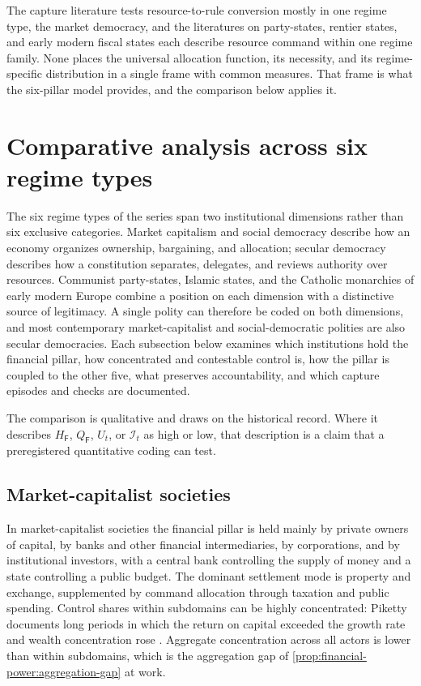 \documentclass[11pt,letterpaper]{article}
\theoremstyle{definition}
\theoremstyle{remark}
\newcommand{\pF}{\mathsf{F}}
\newcommand{\Integ}{\mathcal{I}}
\begin{document}
The capture literature tests resource-to-rule conversion mostly in one regime type, the market democracy, and the literatures on party-states, rentier states, and early modern fiscal states each describe resource command within one regime family. None places the universal allocation function, its necessity, and its regime-specific distribution in a single frame with common measures. That frame is what the six-pillar model provides, and the comparison below applies it.

\section{Comparative analysis across six regime types}
\label{sec:comparative}

The six regime types of the series span two institutional dimensions rather than six exclusive categories. Market capitalism and social democracy describe how an economy organizes ownership, bargaining, and allocation; secular democracy describes how a constitution separates, delegates, and reviews authority over resources. Communist party-states, Islamic states, and the Catholic monarchies of early modern Europe combine a position on each dimension with a distinctive source of legitimacy. A single polity can therefore be coded on both dimensions, and most contemporary market-capitalist and social-democratic polities are also secular democracies. Each subsection below examines which institutions hold the financial pillar, how concentrated and contestable control is, how the pillar is coupled to the other five, what preserves accountability, and which capture episodes and checks are documented.

The comparison is qualitative and draws on the historical record. Where it describes $H_{\pF}$, $Q_{\pF}$, $U_t$, or $\Integ_t$ as high or low, that description is a claim that a preregistered quantitative coding can test.

\subsection{Market-capitalist societies}

In market-capitalist societies the financial pillar is held mainly by private owners of capital, by banks and other financial intermediaries, by corporations, and by institutional investors, with a central bank controlling the supply of money and a state controlling a public budget. The dominant settlement mode is property and exchange, supplemented by command allocation through taxation and public spending. Control shares within subdomains can be highly concentrated: Piketty documents long periods in which the return on capital exceeded the growth rate and wealth concentration rose \citep{piketty2014}. Aggregate concentration across all actors is lower than within subdomains, which is the aggregation gap of \cref{prop:financial-power:aggregation-gap} at work.
\end{document}

